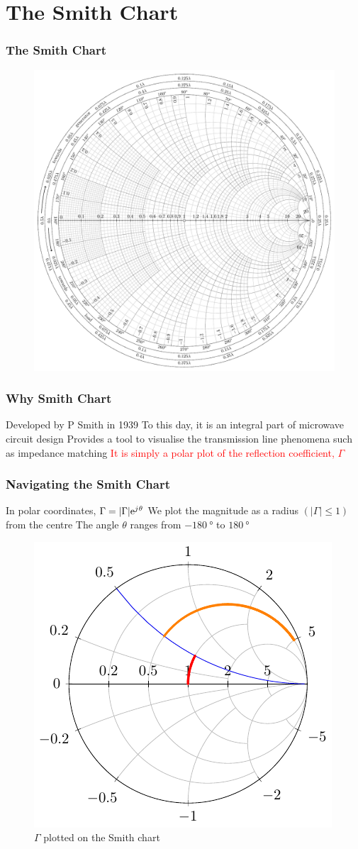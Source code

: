\documentclass[10pt, compress]{beamer}
\newcommand{\e}{\mathrm{e}} %
\renewcommand{\j}{{j}\mkern1mu} %
\begin{document}
\section{The Smith Chart}
\begin{frame}
  \frametitle{The Smith Chart}
\begin{figure}[htbp]
  \centering
  \includegraphics[width=.7\textwidth]{smith.pdf}
\end{figure}
\end{frame}


\begin{frame}
  \frametitle{Why Smith Chart}
\begin{outline}
  \1 Developed by P Smith in 1939
  \1 To this day, it is an integral part of microwave circuit design
  \1 Provides a tool to visualise the transmission line phenomena such as impedance matching
  \1 \textcolor{red}{It is simply a polar plot of the reflection coefficient, $\Gamma$}
\end{outline}
\end{frame}

\begin{frame}
  \frametitle{Navigating the Smith Chart}
\begin{outline}
  \1 In polar coordinates, $\Gamma = |\Gamma| \e^{\j \theta}$
  \1 We plot the magnitude as a radius $(|\Gamma| \le 1)$ from the centre
  \1 The angle $\theta$ ranges from $\SI{-180}{\degree}$ to $\SI{180}{\degree}$
\end{outline}
\begin{figure}[htbp]
  \centering
  \includegraphics[width=.5\textwidth]{smith_example.pdf}
  \caption{$\Gamma$ plotted on the Smith chart }
\end{figure}
\end{frame}
\end{document}
